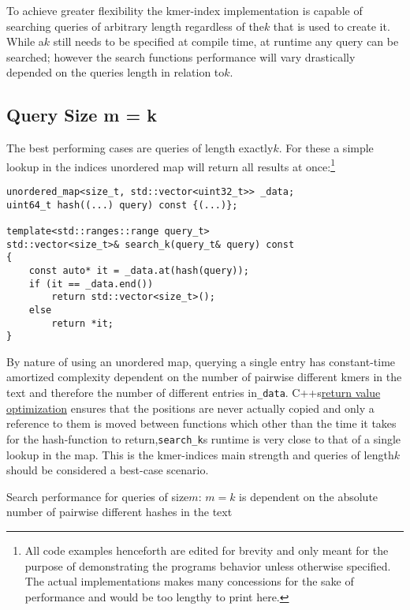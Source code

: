 To achieve greater flexibility the kmer-index implementation is capable
of searching queries of arbitrary length regardless of the$k$ that
is used to create it. While a$k$ still needs to be specified at compile
time, at runtime any query can be searched; however the search functions
performance will vary drastically depended on the queries length in
relation to$k$.

\subsection{\label{section 3.1}Query Size m = k}

The best performing cases are queries of length exactly$k$. For these
a simple lookup in the indices unordered map will return all results
at once:\footnote{All code examples henceforth are edited for brevity and only meant
for the purpose of demonstrating the programs behavior unless otherwise
specified. The actual implementations makes many concessions for the
sake of performance and would be too lengthy to print here.}
\begin{lyxcode}
\begin{lstlisting}[caption={Search function for queries of size k.},language={[GNU]C++},tabsize=4]
unordered_map<size_t, std::vector<uint32_t>> _data;
uint64_t hash((...) query) const {(...)};

template<std::ranges::range query_t>
std::vector<size_t>& search_k(query_t& query) const
{
	const auto* it = _data.at(hash(query));
	if (it == _data.end())
		return std::vector<size_t>();
	else
		return *it;
}
\end{lstlisting}

\end{lyxcode}
By nature of using an unordered map, querying a single entry has constant-time
amortized complexity dependent on the number of pairwise different
kmers in the text and therefore the number of different entries in\lstinline{_data}.
C++s\href{https://en.cppreference.com/w/cpp/language/copy_elision}{return value optimization}
ensures that the positions are never actually copied and only a reference
to them is moved between functions which other than the time it takes
for the hash-function to return,\lstinline{search_k}s runtime is
very close to that of a single lookup in the map. This is the kmer-indices
main strength and queries of length$k$ should be considered a best-case
scenario.
\begin{lem}
\label{Lemma 1}Search performance for queries of size$m:\,m=k$ is
dependent on the absolute number of pairwise different hashes in the
text
\end{lem}

